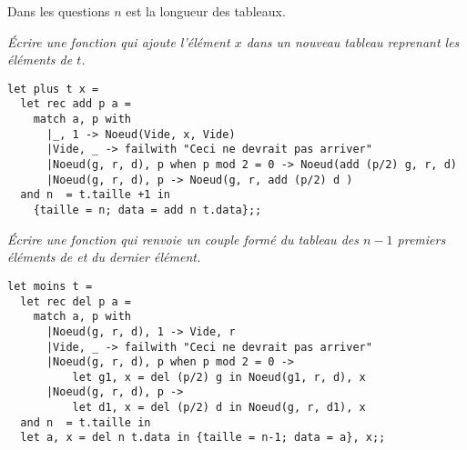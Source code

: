 Dans les questions $n$ est la longueur des tableaux.
\begin{Exercise}[title = Ajouter]\it 
Écrire une fonction  qui ajoute l'élément $x$ dans un nouveau tableau reprenant les éléments de $t$.
\end{Exercise}
\begin{Answer}
\begin{lstlisting}
let plus t x =
  let rec add p a =
    match a, p with
      |_, 1 -> Noeud(Vide, x, Vide)
      |Vide, _ -> failwith "Ceci ne devrait pas arriver"
      |Noeud(g, r, d), p when p mod 2 = 0 -> Noeud(add (p/2) g, r, d) 
      |Noeud(g, r, d), p -> Noeud(g, r, add (p/2) d )
  and n  = t.taille +1 in
    {taille = n; data = add n t.data};;
\end{lstlisting}
\end{Answer}
\begin{Exercise}[title = Enlever]\it 
Écrire une fonction  qui renvoie un couple formé du tableau des $n-1$ premiers éléments de  et du dernier élément.
\end{Exercise}
\begin{Answer}
\begin{lstlisting}
let moins t =
  let rec del p a =
    match a, p with
      |Noeud(g, r, d), 1 -> Vide, r
      |Vide, _ -> failwith "Ceci ne devrait pas arriver"
      |Noeud(g, r, d), p when p mod 2 = 0 -> 
          let g1, x = del (p/2) g in Noeud(g1, r, d), x
      |Noeud(g, r, d), p -> 
          let d1, x = del (p/2) d in Noeud(g, r, d1), x
  and n  = t.taille in
  let a, x = del n t.data in {taille = n-1; data = a}, x;;
\end{lstlisting}
\newpage
\end{Answer}
\medskip

